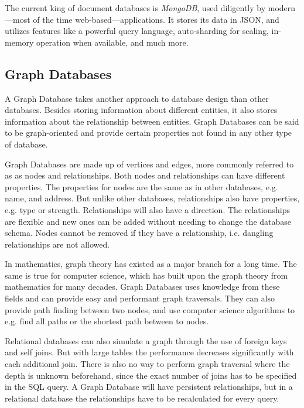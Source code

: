 The current king of document databases is \emph{MongoDB}, used diligently by
modern---most of the time web-based---applications. It stores its data in JSON,
and utilizes features like a powerful query language, auto-sharding for scaling,
in-memory operation when available, and much more.

\subsection{Graph Databases}
\label{intro-graph-db}
A Graph Database takes another approach to database design than other databases. Besides storing information about different entities, it also stores information about the relationship between entities. Graph Databases can be said to be graph-oriented and provide certain properties not found in any other type of database.

Graph Databases are made up of vertices and edges, more commonly referred to as as nodes and relationships. Both nodes and relationships can have different properties. The properties for nodes are the same as in other databases, e.g. name, and address. But unlike other databases, relationships also have properties, e.g. type or strength. Relationships will also have a direction. The relationships are flexible and new ones can be added without needing to change the database schema. Nodes cannot be removed if they have a relationship, i.e. dangling relationships are not allowed.

In mathematics, graph theory has existed as a major branch for a long time. The same is true for computer science, which has built upon the graph theory from mathematics for many decades. Graph Databases uses knowledge from these fields and can provide easy and performant graph traversals. They can also provide path finding between two nodes, and use computer science algorithms to e.g. find all paths or the shortest path between to nodes.

Relational databases can also simulate a graph through the use of foreign keys and self joins. But with large tables the performance decreases significantly with each additional join. There is also no way to perform graph traversal where the depth is unknown beforehand, since the exact number of joins has to be specified in the SQL query. A Graph Database will have persistent relationships, but in a relational database the relationships have to be recalculated for every query.

